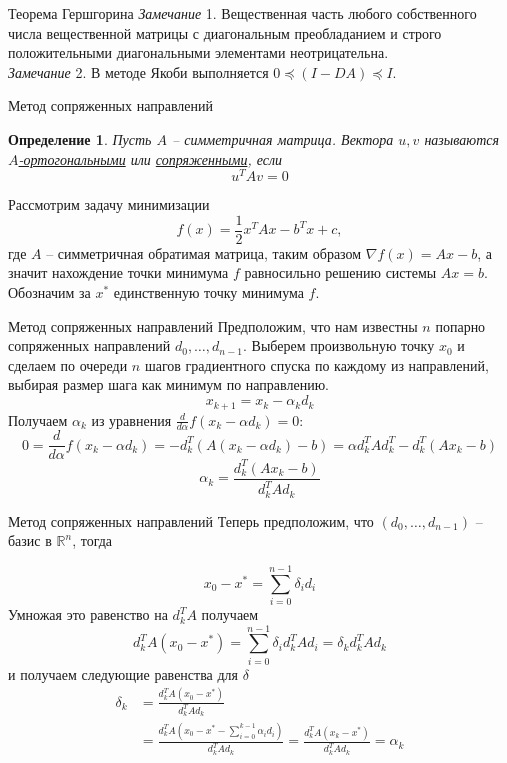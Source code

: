 \documentclass[10pt]{beamer}
\newcounter{def}
\newtheorem{definition_ru}{Определение}[def]
\begin{document}
\begin{frame}{Теорема Гершгорина}
\textit{Замечание} 1. Вещественная часть любого собственного числа вещественной матрицы с диагональным преобладанием и строго положительными диагональными элементами неотрицательна.\\
\pause
\vspace{1em}
\textit{Замечание} 2. В методе Якоби выполняется $0\preceq (I-DA)\preceq I$.
\end{frame}

\begin{frame}{Метод сопряженных направлений}
\begin{definition_ru}
Пусть $A$ -- симметричная матрица. Вектора $u, v$ называются \underline{$A$-ортогональными} или \underline{сопряженными}, если
$$
u^TAv=0
$$
\end{definition_ru}
\pause
Рассмотрим задачу минимизации
$$
f(x)=\frac{1}{2}x^TAx-b^Tx+c,
$$
где $A$ -- симметричная обратимая матрица, таким образом $\nabla f(x)=Ax-b$, а значит нахождение точки минимума $f$ равносильно решению системы $Ax=b$. Обозначим за $x^*$ единственную точку минимума $f$.\\
\end{frame}

\begin{frame}{Метод сопряженных направлений}
Предположим, что нам известны $n$ попарно сопряженных направлений $d_0, \ldots, d_{n-1}$. Выберем произвольную точку $x_0$ и сделаем по очереди $n$ шагов градиентного спуска по каждому из направлений, выбирая размер шага как минимум по направлению.
$$
x_{k+1}=x_k-\alpha_kd_k
$$
\pause
Получаем $\alpha_k$ из уравнения $\frac{d}{d\alpha}f(x_k-\alpha d_k)=0$:
$$
0=\frac{d}{d\alpha}f(x_k-\alpha d_k)=-d_k^T(A(x_k-\alpha d_k)-b)=\alpha d^T_kAd^T_k-d_k^T(Ax_k-b)
$$
\pause
$$
\alpha_k=\frac{d_k^T(Ax_k-b)}{d^T_kAd_k}
$$
\end{frame}

\begin{frame}{Метод сопряженных направлений}
Теперь предположим, что $(d_0, \ldots, d_{n-1})$ -- базис в $\mathbb{R}^n$, тогда

$$
x_0-x^*=\sum_{i=0}^{n-1}\delta_id_i
$$
\pause 
Умножая это равенство на $d_k^TA$ получаем
$$
d_k^TA(x_0-x^*)=\sum_{i=0}^{n-1}\delta_id_k^TAd_i=\delta_kd_k^TAd_k
$$
и получаем следующие равенства для $\delta$
\begin{align*}
\delta_k&=\frac{d^T_kA(x_0-x^*)}{d_k^TAd_k}\\
&=\frac{d^T_kA(x_0-x^*-\sum_{i=0}^{k-1}\alpha_id_i)}{d_k^TAd_k}=\frac{d^T_kA(x_k-x^*)}{d_k^TAd_k}=\alpha_k
\end{align*}
\end{frame}
\end{document}
